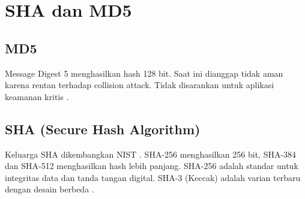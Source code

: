 \section{SHA dan MD5}

\subsection{MD5}
Message Digest 5 menghasilkan hash 128 bit. Saat ini dianggap tidak aman karena rentan terhadap collision attack. Tidak disarankan untuk aplikasi keamanan kritis \cite{stallings2017}.

\subsection{SHA (Secure Hash Algorithm)}
Keluarga SHA dikembangkan NIST \cite{nistfips1804}. SHA-256 menghasilkan 256 bit, SHA-384 dan SHA-512 menghasilkan hash lebih panjang. SHA-256 adalah standar untuk integritas data dan tanda tangan digital. SHA-3 (Keccak) adalah varian terbaru dengan desain berbeda \cite{nistfips1804,stallings2017}.
